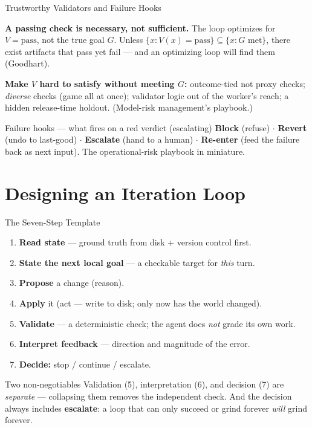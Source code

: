 \documentclass[9pt,t]{beamer}
\begin{document}
\begin{frame}{Trustworthy Validators and Failure Hooks}

\begin{underhood}
\textbf{A passing check is necessary, not sufficient.} The loop optimizes for
$V=\text{pass}$, not the true goal $G$. Unless
$\{x: V(x)=\text{pass}\}\subseteq\{x: G\text{ met}\}$, there exist artifacts that
pass yet fail --- and an optimizing loop will find them (Goodhart).
\end{underhood}

\medskip
\textbf{Make $V$ hard to satisfy without meeting $G$:} outcome-tied not proxy
checks; \emph{diverse} checks (game all at once); validator logic out of the
worker's reach; a hidden release-time holdout. (Model-risk management's playbook.)

\medskip
\begin{block}{Failure hooks --- what fires on a red verdict (escalating)}
\textbf{Block} (refuse) $\cdot$ \textbf{Revert} (undo to last-good) $\cdot$
\textbf{Escalate} (hand to a human) $\cdot$ \textbf{Re-enter} (feed the failure
back as next input). The operational-risk playbook in miniature.
\end{block}
\end{frame}

\section{Designing an Iteration Loop}

\begin{frame}{The Seven-Step Template}

\begin{enumerate}
  \item \textbf{Read state} --- ground truth from disk + version control first.
  \item \textbf{State the next local goal} --- a checkable target for \emph{this} turn.
  \item \textbf{Propose} a change (reason).
  \item \textbf{Apply} it (act --- write to disk; only now has the world changed).
  \item \textbf{Validate} --- a deterministic check; the agent does \emph{not}
        grade its own work.
  \item \textbf{Interpret feedback} --- direction and magnitude of the error.
  \item \textbf{Decide:} stop / continue / \alert{escalate}.
\end{enumerate}

\medskip
\begin{alertblock}{Two non-negotiables}
Validation (5), interpretation (6), and decision (7) are \emph{separate} ---
collapsing them removes the independent check. And the decision always includes
\textbf{escalate}: a loop that can only succeed or grind forever \emph{will}
grind forever.
\end{alertblock}
\end{frame}
\end{document}
